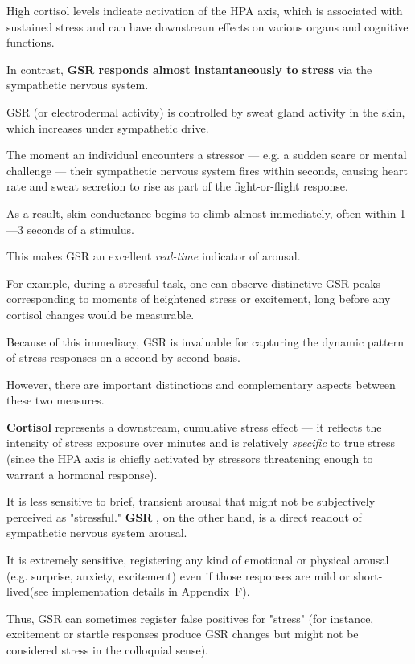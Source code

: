 High cortisol levels indicate activation of the HPA axis, which is associated with sustained stress and can have downstream effects on various organs and cognitive functions.

In contrast, \textbf{GSR responds almost instantaneously to stress}
 via the sympathetic nervous system.

GSR (or electrodermal activity) is controlled by sweat gland activity in the skin, which increases under sympathetic drive.

The moment an individual encounters a stressor --- e.g. a sudden scare or mental challenge --- their sympathetic nervous system fires within seconds, causing heart rate and sweat secretion to rise as part of the fight-or-flight response.

As a result, skin conductance begins to climb almost immediately, often within 1---3 seconds of a stimulus.

This makes GSR an excellent \textit{real-time} indicator of arousal.

For example, during a stressful task, one can observe distinctive GSR peaks corresponding to moments of heightened stress or excitement, long before any cortisol changes would be measurable.

Because of this immediacy, GSR is invaluable for capturing the dynamic pattern of stress responses on a second-by-second basis.

However, there are important distinctions and complementary aspects between these two measures.

\textbf{Cortisol}
 represents a downstream, cumulative stress effect --- it reflects the intensity of stress exposure over minutes and is relatively \textit{specific} to true stress (since the HPA axis is chiefly activated by stressors threatening enough to warrant a hormonal response).

It is less sensitive to brief, transient arousal that might not be subjectively perceived as "stressful." \textbf{GSR}
, on the other hand, is a direct readout of sympathetic nervous system arousal.

It is extremely sensitive, registering any kind of emotional or physical arousal (e.g. surprise, anxiety, excitement) even if those responses are mild or short-lived(see implementation details in Appendix~F).

Thus, GSR can sometimes register false positives for "stress" (for instance, excitement or startle responses produce GSR changes but might not be considered stress in the colloquial sense).

